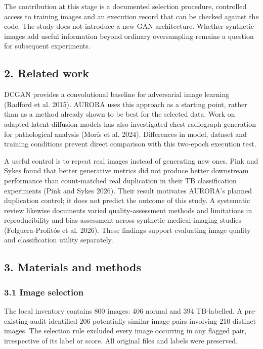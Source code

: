 \documentclass[
]{article}
\begin{document}
The contribution at this stage is a documented selection procedure,
controlled access to training images and an execution record that can be
checked against the code. The study does not introduce a new GAN
architecture. Whether synthetic images add useful information beyond
ordinary oversampling remains a question for subsequent experiments.

\subsection{2. Related work}\label{related-work}

DCGAN provides a convolutional baseline for adversarial image learning
(Radford et al. 2015). AURORA uses this approach as a starting point,
rather than as a method already shown to be best for the selected data.
Work on adapted latent diffusion models has also investigated chest
radiograph generation for pathological analysis (Morís et al. 2024).
Differences in model, dataset and training conditions prevent direct
comparison with this two-epoch execution test.

A useful control is to repeat real images instead of generating new
ones. Pink and Sykes found that better generative metrics did not
produce better downstream performance than count-matched real
duplication in their TB classification experiments (Pink and Sykes
2026). Their result motivates AURORA's planned duplication control; it
does not predict the outcome of this study. A systematic review likewise
documents varied quality-assessment methods and limitations in
reproducibility and bias assessment across synthetic medical-imaging
studies ({Folguera-Profitós et al.} 2026). These findings support
evaluating image quality and classification utility separately.

\subsection{3. Materials and methods}\label{materials-and-methods}

\subsubsection{3.1 Image selection}\label{image-selection}

The local inventory contains 800 images: 406 normal and 394 TB-labelled.
A pre-existing audit identified 206 potentially similar image pairs
involving 210 distinct images. The selection rule excluded every image
occurring in any flagged pair, irrespective of its label or score. All
original files and labels were preserved.
\end{document}
